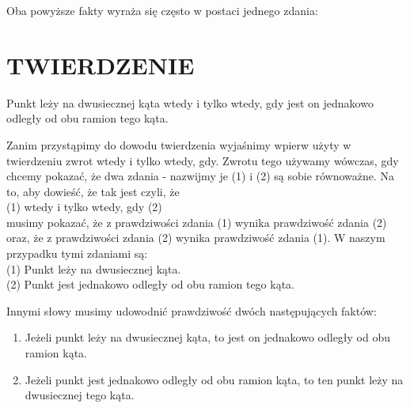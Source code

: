 \documentclass[10pt]{article}
\begin{document}
Oba powyższe fakty wyraża się często w postaci jednego zdania:

\section*{TWIERDZENIE}
Punkt leży na dwusiecznej kąta wtedy i tylko wtedy, gdy jest on jednakowo odległy od obu ramion tego kąta.

Zanim przystąpimy do dowodu twierdzenia wyjaśnimy wpierw użyty w twierdzeniu zwrot wtedy i tylko wtedy, gdy. Zwrotu tego używamy wówczas, gdy chcemy pokazać, że dwa zdania - nazwijmy je (1) i (2) są sobie równoważne. Na to, aby dowieść, że tak jest czyli, że\\
(1) wtedy i tylko wtedy, gdy (2)\\
musimy pokazać, że z prawdziwości zdania (1) wynika prawdziwość zdania (2) oraz, że z prawdziwości zdania (2) wynika prawdziwość zdania (1). W naszym przypadku tymi zdaniami są:\\
(1) Punkt leży na dwusiecznej kąta.\\
(2) Punkt jest jednakowo odległy od obu ramion tego kąta.

Innymi słowy musimy udowodnić prawdziwość dwóch następujących faktów:

\begin{enumerate}
  \item Jeżeli punkt leży na dwusiecznej kąta, to jest on jednakowo odległy od obu ramion kąta.
  \item Jeżeli punkt jest jednakowo odległy od obu ramion kąta, to ten punkt leży na dwusiecznej tego kąta.
\end{enumerate}
\end{document}
